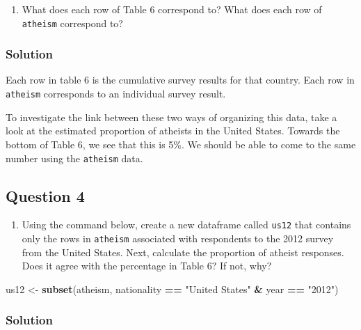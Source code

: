 \documentclass[]{article}
\newenvironment{Shaded}{\begin{snugshade}}{\end{snugshade}}
\newcommand{\KeywordTok}[1]{\textcolor[rgb]{0.13,0.29,0.53}{\textbf{#1}}}
\newcommand{\StringTok}[1]{\textcolor[rgb]{0.31,0.60,0.02}{#1}}
\newcommand{\OperatorTok}[1]{\textcolor[rgb]{0.81,0.36,0.00}{\textbf{#1}}}
\newcommand{\NormalTok}[1]{#1}
\providecommand{\tightlist}{%
  \setlength{\itemsep}{0pt}\setlength{\parskip}{0pt}}
\begin{document}
\begin{enumerate}
\def\labelenumi{\arabic{enumi}.}
\setcounter{enumi}{2}
\tightlist
\item
  What does each row of Table 6 correspond to? What does each row of
  \texttt{atheism} correspond to?
\end{enumerate}

\subsubsection{Solution}\label{solution-2}

Each row in table 6 is the cumulative survey results for that country.
Each row in \texttt{atheism} corresponds to an individual survey result.

To investigate the link between these two ways of organizing this data,
take a look at the estimated proportion of atheists in the United
States. Towards the bottom of Table 6, we see that this is 5\%. We
should be able to come to the same number using the \texttt{atheism}
data.

\subsection{Question 4}\label{question-4}

\begin{enumerate}
\def\labelenumi{\arabic{enumi}.}
\setcounter{enumi}{3}
\tightlist
\item
  Using the command below, create a new dataframe called \texttt{us12}
  that contains only the rows in \texttt{atheism} associated with
  respondents to the 2012 survey from the United States. Next, calculate
  the proportion of atheist responses. Does it agree with the percentage
  in Table 6? If not, why?
\end{enumerate}

\begin{Shaded}
\begin{Highlighting}[]
\NormalTok{us12 <-}\StringTok{ }\KeywordTok{subset}\NormalTok{(atheism, nationality }\OperatorTok{==}\StringTok{ "United States"} \OperatorTok{&}\StringTok{ }\NormalTok{year }\OperatorTok{==}\StringTok{ "2012"}\NormalTok{)}
\end{Highlighting}
\end{Shaded}

\subsubsection{Solution}\label{solution-3}
\end{document}
